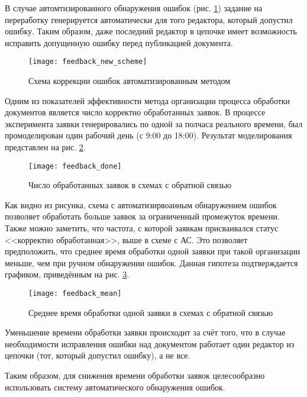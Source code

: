 \vspace{\baselineskip}
В случае автомтизированного обнаружения ошибок (рис. \ref{img:feedback_new_scheme}) задание на переработку генерируется автоматически для того редактора, который допустил ошибку. Таким образом, даже последний редактор в цепочке имеет возможность исправить допущенную ошибку перед публикацией документа.

\begin{figure}[h!]
  \centering
  \texttt{[image: feedback\_new\_scheme]}
  \caption{Схема коррекции ошибок автоматизированным методом}
  \label{img:feedback_new_scheme}
\end{figure}

\vspace{\baselineskip}
Одним из показателей эффективности метода организации процесса обработки документов является число корректно обработанных заявок. В процессе эксперимента заявки генерировались по одной за полчаса реального времени, был промоделирован один рабочий день (с 9:00 до 18:00). Результат моделирования представлен на рис. \ref{img:feedback_done}.

\begin{figure}[h!]
  \centering
  \texttt{[image: feedback\_done]}
  \caption{Число обработанных заявок в схемах с обратной связью}
  \label{img:feedback_done}
\end{figure}

\vspace{\baselineskip}
Как видно из рисунка, схема с автоматизирвоанным обнаружением ошибок позволяет обработать больше заявок за ограниченный промежуток времени. Также можно заметить, что частота, с которой заявкам присваивался статус <<корректно обработанная>>, выше в схеме с АС. Это позволяет предположить, что среднее время обработки одной заявки при такой организации меньше, чем при ручном обнаружении ошибок. Данная гипотеза подтверждается графиком, приведённым на рис. \ref{img:feedback_mean}.

\begin{figure}[h!]
  \centering
  \texttt{[image: feedback\_mean]}
  \caption{Среднее время обработки одной заявки в схемах с обратной связью}
  \label{img:feedback_mean}
\end{figure}

\vspace{\baselineskip}
Уменьшение времени обработки заявки происходит за счёт того, что в случае необходимости исправления ошибки над документом работает один редактор из цепочки (тот, который допустил ошибку), а не все.

\vspace{\baselineskip}
Таким образом, для снижения времени обработки заявок целесообразно использовать систему автоматического обнаружения ошибок.
\FloatBarrier